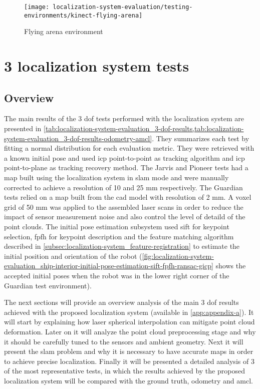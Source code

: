 \begin{figure}[H]
	\centering
	\texttt{[image: localization-system-evaluation/testing-environments/kinect-flying-arena]}
	\caption{Flying arena environment \cite{Pomerleau2011}}
	\label{fig:localization-system-evaluation_flying-arena}
\end{figure}




\section{3  localization system tests}


\subsection{Overview}

The main results of the 3 \gls{dof} tests performed with the localization system are presented in \cref{tab:localization-system-evaluation_3-dof-results,tab:localization-system-evaluation_3-dof-results-odometry-amcl}. They summarizes each test by fitting a normal distribution for each evaluation metric. They were retrieved with a known initial pose and used \gls{icp} point-to-point as tracking algorithm and \gls{icp} point-to-plane as tracking recovery method. The Jarvis and Pioneer tests had a map built using the localization system in \gls{slam} mode and were manually corrected to achieve a resolution of 10 and 25 mm respectively. The Guardian tests relied on a map built from the \gls{cad} model with resolution of 2 mm. A voxel grid of 50 mm was applied to the assembled laser scans in order to reduce the impact of sensor measurement noise and also control the level of detaild of the point clouds. The initial pose estimation subsystem used \gls{sift} for keypoint selection, \gls{fpfh} for keypoint description and the feature matching algorithm described in \cref{subsec:localization-system_feature-registration} to estimate the initial position and orientation of the robot (\cref{fig:localization-system-evaluation_ship-interior-initial-pose-estimation-sift-fpfh-ransac-gicp} shows the accepted initial poses when the robot was in the lower right corner of the Guardian test environment).

The next sections will provide an overview analysis of the main 3 \gls{dof} results achieved with the proposed localization system (available in \cref{app:appendix-a}). It will start by explaining how laser spherical interpolation can mitigate point cloud deformation. Later on it will analyze the point cloud preprocessing stage and why it should be carefully tuned to the sensors and ambient geometry. Next it will present the \gls{slam} problem and why it is necessary to have accurate maps in order to achieve precise localization. Finally it will be presented a detailed analysis of 3 of the most representative tests, in which the results achieved by the proposed localization system will be compared with the ground truth, odometry and \gls{amcl}.

